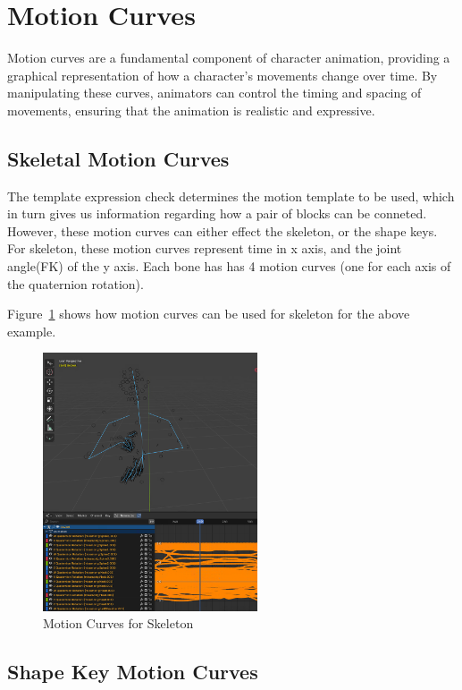 \documentclass[../../main.tex]{subfiles}
\begin{document}
\section{Motion Curves}
\label{ch:intermediate_blocks:curves}

Motion curves are a fundamental component of character animation, providing a graphical representation of how a character's movements change over time. By manipulating these curves, animators can control the timing and spacing of movements, ensuring that the animation is realistic and expressive.

\subsection{Skeletal Motion Curves}
\label{ch:intermediate_blocks:curves:skeletal}

The template expression check determines the motion template to be used, which in turn gives us information regarding how a pair of blocks can be conneted. However, these motion curves can either effect the skeleton, or the shape keys. For skeleton, these motion curves represent time in x axis, and the joint angle(FK) of the y axis. Each bone has has 4 motion curves (one for each axis of the quaternion rotation).

Figure~\ref{fig:motion_curves_skeletal} shows how motion curves can be used for skeleton for the above example.

\begin{figure}
    \centering \includegraphics[width = 2.5in]{chapters/intermediate_blocks/images/motion_curves_skeletal.png}
    \caption{Motion Curves for Skeleton}
    \label{fig:motion_curves_skeletal}
\end{figure}

\subsection{Shape Key Motion Curves}
\label{ch:intermediate_blocks:curves:shape_keys}
\end{document}
